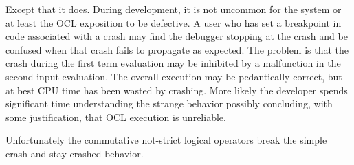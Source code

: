 \documentclass[
]{ceurart}
\begin{document}
Except that it does. During development, it is not uncommon for the system or at least the OCL exposition to be defective. A user who has set a breakpoint in code associated with a crash may find the debugger stopping at the crash and be confused when that crash fails to propagate as expected. The problem is that  the crash during the first term evaluation may be inhibited by a malfunction in the second input evaluation. The overall execution may be pedantically correct, but at best CPU time has been wasted by crashing. More likely the developer spends significant time understanding the strange behavior possibly concluding, with some justification, that OCL execution is unreliable.



Unfortunately the commutative not-strict logical operators break the simple crash-and-stay-crashed behavior.


\end{document}
